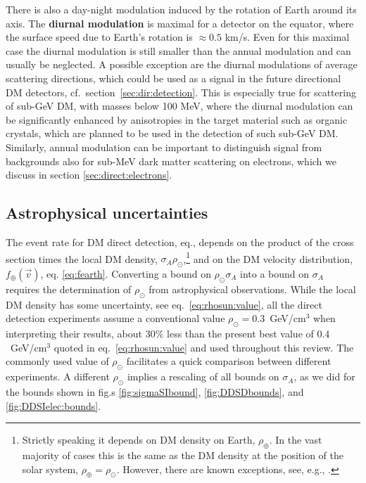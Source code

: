 There is also a day-night modulation induced by the rotation of Earth around its axis.  The {\bf diurnal modulation} is maximal for a detector on the equator, where the surface speed due to Earth's rotation is $\approx 0.5$ km/s. Even for this maximal case the diurnal modulation is still smaller than the annual modulation and can usually be neglected. A possible exception are the diurnal modulations of average scattering directions, which could be used as a signal in the future directional DM detectors, cf.~section~\ref{sec:dir:detection}. This is especially true for scattering of  sub-GeV DM, with masses below 100 MeV, where the diurnal modulation can be significantly enhanced by anisotropies in the target material such as organic crystals, which are planned to be used in the detection of such sub-GeV DM. Similarly, annual modulation can be important to distinguish signal from backgrounds also for sub-MeV dark matter scattering on electrons, which we discuss in section \ref{sec:direct:electrons}.




\subsection{Astrophysical uncertainties}
\label{astrodirect}

The event rate for DM direct detection, eq.,
depends on the product of the cross section times the local DM density, $\sigma_A \rho_\odot$,\footnote{Strictly speaking it depends on DM density on Earth, $\rho_\oplus$. In the vast majority of cases this is the same as the DM density at the position of the solar system, $\rho_\oplus=\rho_\odot$. However, there are known exceptions, see, e.g., \cite{MirrorDM:DD}.} 
and on the DM velocity distribution, $f_\oplus (\vec v)$, eq. \eqref{eq:fearth}. 
Converting a bound on $\rho_\odot \sigma_A$ into a bound on  $\sigma_A$ requires 
the determination of $\rho_\odot$ from astrophysical observations. 
While the local DM density has some uncertainty, see eq.~\eqref{eq:rhosun:value}, 
all the direct detection experiments assume a conventional value $\rho_\odot =0.3$~GeV/cm${}^3$ when interpreting their results, about $30\%$ less than the present best value of $0.4$~GeV/cm${}^3$ 
quoted in eq.~\eqref{eq:rhosun:value} and used throughout this review. 
The commonly used value of $\rho_\odot$ facilitates a quick comparison between different experiments. 
A different $\rho_\odot$ implies a rescaling of all bounds on $\sigma_A$, as we did for the bounds shown in fig.s \ref{fig:sigmaSIbound}, \ref{fig:DDSDbounds}, and \ref{fig:DDSIelec:bounds}.

